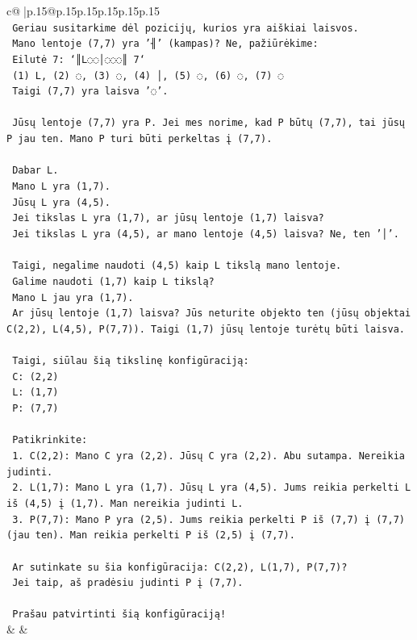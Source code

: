 \documentclass{article}
\begin{document}
{\begin{supertabular}{c@{$\;$}|p{.15\linewidth}@{}p{.15\linewidth}p{.15\linewidth}p{.15\linewidth}p{.15\linewidth}p{.15\linewidth}}
{{{\\ 
\texttt{   Geriau susitarkime dėl pozicijų, kurios yra aiškiai laisvos.} \\
\texttt{   Mano lentoje (7,7) yra '╢' (kampas)? Ne, pažiūrėkime:} \\
\texttt{   Eilutė 7: `║L◌◌│◌◌◌║ 7`} \\
\texttt{   (1) L, (2) ◌, (3) ◌, (4) │, (5) ◌, (6) ◌, (7) ◌} \\
\texttt{   Taigi (7,7) yra laisva '◌'.} \\
\\ 
\texttt{   Jūsų lentoje (7,7) yra P. Jei mes norime, kad P būtų (7,7), tai jūsų P jau ten. Mano P turi būti perkeltas į (7,7).} \\
\\ 
\texttt{   Dabar L.} \\
\texttt{   Mano L yra (1,7).} \\
\texttt{   Jūsų L yra (4,5).} \\
\texttt{   Jei tikslas L yra (1,7), ar jūsų lentoje (1,7) laisva?} \\
\texttt{   Jei tikslas L yra (4,5), ar mano lentoje (4,5) laisva? Ne, ten '│'.} \\
\\ 
\texttt{   Taigi, negalime naudoti (4,5) kaip L tikslą mano lentoje.} \\
\texttt{   Galime naudoti (1,7) kaip L tikslą?} \\
\texttt{   Mano L jau yra (1,7).} \\
\texttt{   Ar jūsų lentoje (1,7) laisva? Jūs neturite objekto ten (jūsų objektai C(2,2), L(4,5), P(7,7)). Taigi (1,7) jūsų lentoje turėtų būti laisva.} \\
\\ 
\texttt{   Taigi, siūlau šią tikslinę konfigūraciją:} \\
\texttt{   C: (2,2)} \\
\texttt{   L: (1,7)} \\
\texttt{   P: (7,7)} \\
\\ 
\texttt{   Patikrinkite:} \\
\texttt{   1. C(2,2): Mano C yra (2,2). Jūsų C yra (2,2). Abu sutampa. Nereikia judinti.} \\
\texttt{   2. L(1,7): Mano L yra (1,7). Jūsų L yra (4,5). Jums reikia perkelti L iš (4,5) į (1,7). Man nereikia judinti L.} \\
\texttt{   3. P(7,7): Mano P yra (2,5). Jums reikia perkelti P iš (7,7) į (7,7) (jau ten). Man reikia perkelti P iš (2,5) į (7,7).} \\
\\ 
\texttt{   Ar sutinkate su šia konfigūracija: C(2,2), L(1,7), P(7,7)?} \\
\texttt{   Jei taip, aš pradėsiu judinti P į (7,7).} \\
\\ 
\texttt{   Prašau patvirtinti šią konfigūraciją!} \\
            }
        }
    }
    & & \\ \\


\end{supertabular}}
\end{document}
